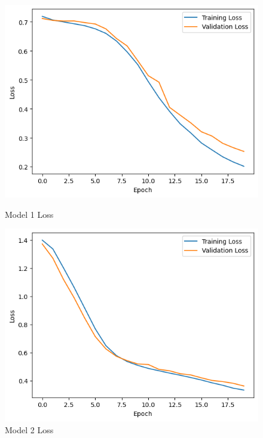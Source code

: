 \documentclass{article}
\begin{document}
\begin{figure}[h!]
    \centering
    \begin{minipage}{0.45\textwidth}
        \centering
        \includegraphics[width=1\textwidth]{tf_part1_loss.png} %
        \caption{Model 1 Loss}
    \end{minipage}\hfill
    \begin{minipage}{0.45\textwidth}
        \centering
        \includegraphics[width=1\textwidth]{tf_part2_loss.png} %
        \caption{Model 2 Loss}
    \end{minipage}
\end{figure}
\end{document}
